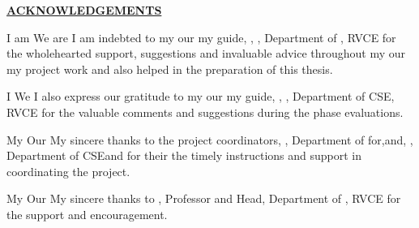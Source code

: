 \thispagestyle{empty}
\ifIDP \vspace{-1cm}\fi
\begin{center}
	\Large\textbf{\underline{ACKNOWLEDGEMENTS}} \par
\end{center}

\ifPG I am \else
\ifStuNameBUsed We are \else I am \fi\fi indebted to \ifPG my \else\ifStuNameBUsed our \else my \fi\fi guide, \textbf{\printGuideNameA}, \printGuideDesigA, Department of \printGuideDeptAInSF, RVCE for the wholehearted support, suggestions and invaluable advice throughout \ifPG my \else\ifStuNameBUsed our \else my \fi\fi project work and also helped in the preparation of this thesis.\\ \par


\ifPG I \else \ifStuNameBUsed We \else I \fi\fi also express our gratitude to \ifPG my \else\ifStuNameBUsed our \else my \fi\fi guide, \textbf{\printGuideNameB}, \printGuideDesigB, Department of CSE, RVCE for the valuable comments and suggestions during the phase evaluations. \\ \par


\ifPG My \else \ifStuNameBUsed Our \else My \fi\fi sincere thanks to the project coordinator\ifIDP\else\ifProjectMemBUsed s\fi\fi\space \textbf{\printProjectMemberA}, \printPanelMemberDesigA, Department of \printProjectMemberDeptAInSF \ifIDP \space for\space \else\ifProjectMemBUsed \ifProjectMemCUsed,\space \else\space and\space \fi\textbf{\printProjectMemberB}, \printPanelMemberDesigB, Department of  CSE\ifProjectMemCUsed\space and \textbf{\printProjectMemberC} \fi\fi\space for \ifProjectMemBUsed their \else the \fi\fi timely instructions and support in coordinating the project.\\ \par



\ifPG My \else \ifStuNameBUsed Our \else My \fi\fi sincere thanks to \textbf{\printHOD}, Professor and Head, Department of \ifIDP \printGuideDeptAInLF\else\printDepartmentLF\fi, RVCE for the support and encouragement.\\ \par


